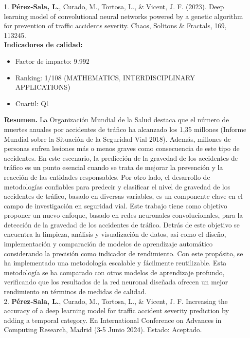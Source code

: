 \documentclass{uathesis-es}
\begin{document}
{		1. \textbf{Pérez-Sala, L.}, Curado, M., Tortosa, L., \& Vicent, J. F. (2023). Deep learning model of convolutional neural networks powered by a genetic algorithm for prevention of traffic accidents severity. Chaos, Solitons \& Fractals, 169, 113245.\\
		
		\textbf{Indicadores de calidad:} 
		\begin{itemize}
			\item Factor de impacto: 9.992
			\item Ranking: 1/108 (MATHEMATICS, INTERDISCIPLINARY APPLICATIONS)
			\item Cuartil: Q1
		\end{itemize}
		
		\textbf{Resumen.} La Organización Mundial de la Salud destaca que el número de muertes anuales por accidentes de tráfico ha alcanzado los 1,35 millones (Informe Mundial sobre la Situación de la Seguridad Vial 2018). Además, millones de personas sufren lesiones más o menos graves como consecuencia de este tipo de accidentes. En este escenario, la predicción de la gravedad de los accidentes de tráfico es un punto esencial cuando se trata de mejorar la prevención y la reacción de las entidades responsables. Por otro lado, el desarrollo de metodologías confiables para predecir y clasificar el nivel de gravedad de los accidentes de tráfico, basado en diversas variables, es un componente clave en el campo de investigación en seguridad vial. Este trabajo tiene como objetivo proponer un nuevo enfoque, basado en redes neuronales convolucionales, para la detección de la gravedad de los accidentes de tráfico. Detrás de este objetivo se encuentra la limpieza, análisis y visualización de datos, así como el diseño, implementación y comparación de modelos de aprendizaje automático considerando la precisión como indicador de rendimiento.
		Con este propósito, se ha implementado una metodología escalable y fácilmente reutilizable. Esta metodología se ha comparado con otros modelos de aprendizaje profundo, verificando que los resultados de la red neuronal diseñada ofrecen un mejor rendimiento en términos de medidas de calidad.\\
		
		
		2. \textbf{Pérez-Sala, L.}, Curado, M., Tortosa, L., \& Vicent, J. F. Increasing the accuracy of a deep learning model for traffic accident severity prediction by adding a temporal category. En International Conference on Advances in Computing Research, Madrid (3-5 Junio 2024). Estado: Aceptado.\\
		
}
\end{document}
